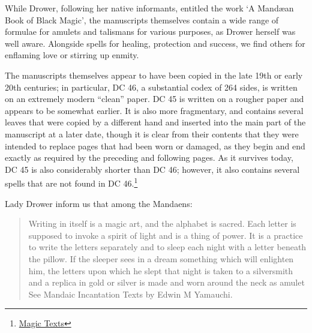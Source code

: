  While Drower, following her native informants, entitled the work ‘A Mandæan Book of Black Magic’, the manuscripts themselves contain a wide range of formulae for amulets and talismans for various purposes, as Drower herself was well aware. Alongside spells for healing, protection and success, we find others for enflaming love or stirring up enmity.

 The manuscripts themselves appear to have been copied in the late 19th or early 20th centuries; in particular, DC 46, a substantial codex of 264 sides, is written on an extremely modern “clean” paper. DC 45 is written on a rougher paper and appears to be somewhat earlier. It is also more fragmentary, and contains several leaves that were copied by a different hand and inserted into the main part of the manuscript at a later date, though it is clear from their contents that they were intended to replace pages that had been worn or damaged, as they begin and end exactly as required by the preceding and following pages. As it survives today, DC 45 is also considerably shorter than DC 46; however, it also contains several spells that are not found in DC 46.\footnote{\protect\href{http://www.academia.edu/8294938/Arabic_Magic_Texts_in_Mandaic_Script_A_Forgotten_Chapter_in_Near-Eastern_Magic}{Magic Texts}}

Lady Drower inform us that among the Mandaens:

\begin{quote}
Writing in itself is a magic art, and the alphabet is sacred.
Each letter is supposed to invoke a spirit of light and is a thing of power. It is a practice to write the letters separately and to sleep each night with a letter beneath the pillow. If the sleeper sees in a dream something which will enlighten him, the letters upon which he slept that night is taken to a silversmith and a replica in gold or silver is made and worn around the neck as amulet See Mandaic Incantation Texts by Edwin M Yamauchi.
\end{quote}











